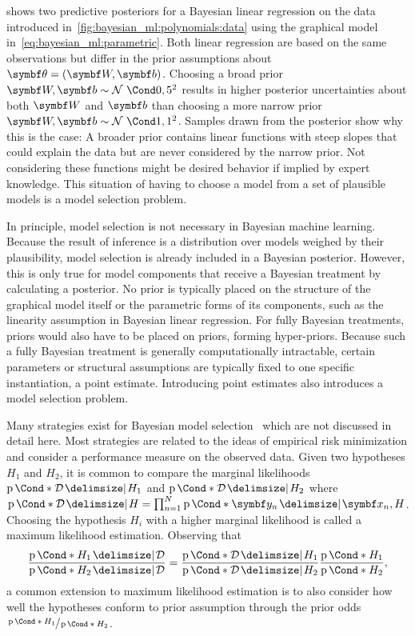  shows two predictive posteriors for a Bayesian linear regression on the data introduced in~\cref{fig:bayesian_ml:polynomials:data} using the graphical model in~\cref{eq:bayesian_ml:parametric}.
Both linear regression are based on the same observations but differ in the prior assumptions about $\mat{\theta} = (\mat{W}, \mat{b})$.
Choosing a broad prior $\mat{W}, \mat{b} \sim \Gaussian{0, 5^2}$ results in higher posterior uncertainties about both $\mat{W}$ and $\mat{b}$ than choosing a more narrow prior $\mat{W}, \mat{b} \sim \Gaussian{1, 1^2}$.
Samples drawn from the posterior show why this is the case:
A broader prior contains linear functions with steep slopes that could explain the data but are never considered by the narrow prior.
Not considering these functions might be desired behavior if implied by expert knowledge.
This situation of having to choose a model from a set of plausible models is a model selection problem.

In principle, model selection is not necessary in Bayesian machine learning.
Because the result of inference is a distribution over models weighed by their plausibility, model selection is already included in a Bayesian posterior.
However, this is only true for model components that receive a Bayesian treatment by calculating a posterior.
No prior is typically placed on the structure of the graphical model itself or the parametric forms of its components, such as the linearity assumption in Bayesian linear regression.
For fully Bayesian treatments, priors would also have to be placed on priors, forming hyper-priors.
Because such a fully Bayesian treatment is generally computationally intractable, certain parameters or structural assumptions are typically fixed to one specific instantiation, a point estimate.
Introducing point estimates also introduces a model selection problem.

Many strategies exist for Bayesian model selection~\parencite{andrew_gelman_bayesian_2013,murphy_machine_2012,david_barber_bayesian_2012} which are not discussed in detail here.
Most strategies are related to the ideas of empirical risk minimization and consider a performance measure on the observed data.
Given two hypotheses $H_1$ and $H_2$, it is common to compare the marginal likelihoods $\Prob*{\Dc \given H_1}$ and $\Prob*{\Dc \given H_2}$ where $\Prob*{\Dc \given H} = \prod_{n=1}^N \Prob*{\mat{y}_n \given \mat{x}_n, H}$.
Choosing the hypothesis $H_i$ with a higher marginal likelihood is called a maximum likelihood estimation.
Observing that
\begin{align}
\begin{split}
    \frac{\Prob*{H_1 \given \Dc}}{\Prob*{H_2 \given \Dc}} = \frac{\Prob*{\Dc \given H_1}}{\Prob*{\Dc \given H_2}} \frac{\Prob*{H_1}}{\Prob*{H_2}},
\end{split}
\end{align}
a common extension to maximum likelihood estimation is to also consider how well the hypotheses conform to prior assumption through the prior odds $\sfrac{\Prob*{H_1}}{\Prob*{H_2}}$.

